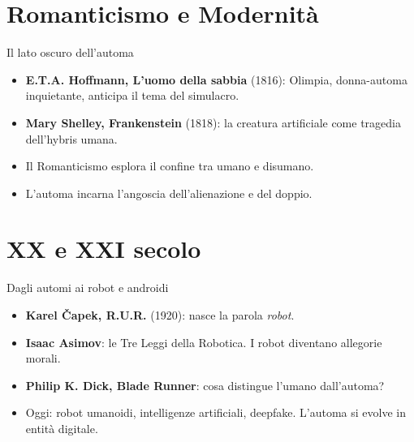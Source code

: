 \documentclass{beamer}
\begin{document}
\section{Romanticismo e Modernità}
%
%
\begin{frame}{Il lato oscuro dell’automa}
  \begin{itemize}
    \item \textbf{E.T.A. Hoffmann, L'uomo della sabbia} (1816): Olimpia, donna-automa inquietante, anticipa il tema del simulacro.
    \item \textbf{Mary Shelley, Frankenstein} (1818): la creatura artificiale come tragedia dell’hybris umana.
    \item Il Romanticismo esplora il confine tra umano e disumano.
    \item L’automa incarna l’angoscia dell’alienazione e del doppio.
  \end{itemize}
\end{frame}
%
\section{XX e XXI secolo}
%
%
\begin{frame}{Dagli automi ai robot e androidi}
  \begin{itemize}
    \item \textbf{Karel Čapek, R.U.R.} (1920): nasce la parola \emph{robot}.
    \item \textbf{Isaac Asimov}: le Tre Leggi della Robotica. I robot diventano allegorie morali.
    \item \textbf{Philip K. Dick, Blade Runner}: cosa distingue l'umano dall'automa?
    \item Oggi: robot umanoidi, intelligenze artificiali, deepfake. L’automa si evolve in entità digitale.
  \end{itemize}
\end{frame}
%
\end{document}
